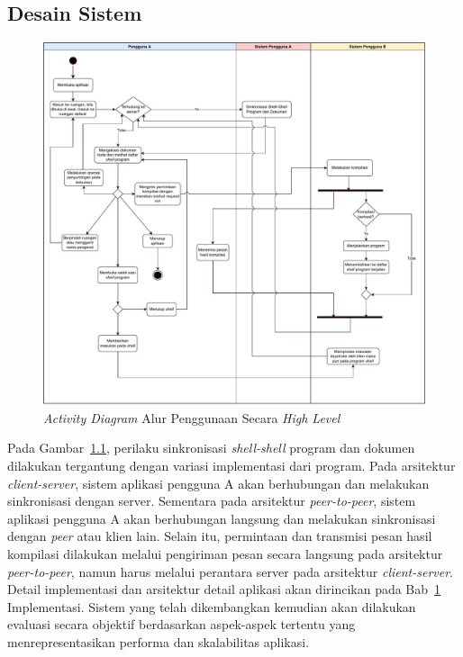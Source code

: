 \chapter{\babEmpat}
\label{bab:4}

\section{Desain Sistem}

\begin{figure}
    \centering
    \includegraphics[scale=0.5]{assets/skripsi/Activity_Diagram}
    \caption{\textit{Activity Diagram} Alur Penggunaan Secara \textit{High Level}}
    \label{fig:activity}
\end{figure}

Pada Gambar~\ref{fig:activity}, perilaku sinkronisasi \textit{shell-shell} program dan dokumen dilakukan tergantung dengan variasi implementasi dari program. Pada arsitektur \textit{client-server}, sistem aplikasi pengguna A akan berhubungan dan melakukan sinkronisasi dengan server. Sementara pada arsitektur \textit{peer-to-peer}, sistem aplikasi pengguna A akan berhubungan langsung dan melakukan sinkronisasi dengan \textit{peer} atau klien lain. Selain itu, permintaan dan transmisi pesan hasil kompilasi dilakukan melalui pengiriman pesan secara langsung pada arsitektur \textit{peer-to-peer}, namun harus melalui perantara server pada arsitektur \textit{client-server}. Detail implementasi dan arsitektur detail aplikasi akan dirincikan pada Bab~\ref{bab:4} Implementasi. Sistem yang telah dikembangkan kemudian akan dilakukan evaluasi secara objektif berdasarkan aspek-aspek tertentu yang menrepresentasikan performa dan skalabilitas aplikasi.

